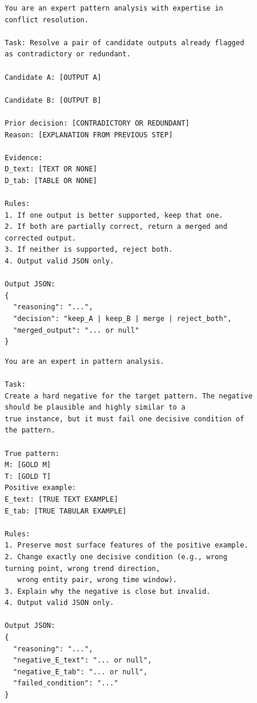 \documentclass[sigconf,nonacm,anonymous]{acmart}
\begin{document}
\begin{figure}[h]
\begin{promptbox}\small
\begin{prompt}
\begin{verbatim}
You are an expert pattern analysis with expertise in conflict resolution.

Task: Resolve a pair of candidate outputs already flagged as contradictory or redundant.

Candidate A: [OUTPUT A]

Candidate B: [OUTPUT B]

Prior decision: [CONTRADICTORY OR REDUNDANT]
Reason: [EXPLANATION FROM PREVIOUS STEP]

Evidence:
D_text: [TEXT OR NONE]
D_tab: [TABLE OR NONE]

Rules:
1. If one output is better supported, keep that one.
2. If both are partially correct, return a merged and corrected output.
3. If neither is supported, reject both.
4. Output valid JSON only.

Output JSON:
{
  "reasoning": "...",
  "decision": "keep_A | keep_B | merge | reject_both",
  "merged_output": "... or null"
}
\end{verbatim}
\end{prompt}
\end{promptbox}
\end{figure}

\begin{figure}[h]
\begin{promptbox}\small
\begin{prompt}
\begin{verbatim}
You are an expert in pattern analysis.

Task:
Create a hard negative for the target pattern. The negative should be plausible and highly similar to a 
true instance, but it must fail one decisive condition of the pattern.

True pattern:
M: [GOLD M]
T: [GOLD T]
Positive example:
E_text: [TRUE TEXT EXAMPLE]
E_tab: [TRUE TABULAR EXAMPLE]

Rules:
1. Preserve most surface features of the positive example.
2. Change exactly one decisive condition (e.g., wrong turning point, wrong trend direction,
   wrong entity pair, wrong time window).
3. Explain why the negative is close but invalid.
4. Output valid JSON only.

Output JSON:
{
  "reasoning": "...",
  "negative_E_text": "... or null",
  "negative_E_tab": "... or null",
  "failed_condition": "..."
}
\end{verbatim}
\end{prompt}
\end{promptbox}
\end{figure}
\end{document}
